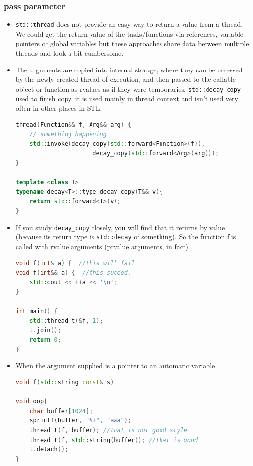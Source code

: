 \documentclass[a4paper,11pt,twoside]{book}
\begin{document}
\subsubsection{pass parameter}

\begin{itemize}
	\item \texttt{std::thread} does not provide an easy way to return a value from a thread. We could get the return value of the tasks/functions via references, variable pointers or global variables but these approaches share data between multiple threads and look a bit cumbersome.
	
	\item The arguments are copied into internal storage, where they can be accessed by the newly created thread of execution, and then passed to the callable object or function as rvalues as if they were temporaries. \texttt{std::decay\_copy} used to finish copy. it is used mainly in thread context and isn't used very often in other places in STL.
	
\begin{lstlisting}[frame=single, language=c++]
thread(Function&& f, Arg&& arg) {
	// something happening
	std::invoke(decay_copy(std::forward<Function>(f)),
	                  decay_copy(std::forward<Arg>(arg)));
}
	
template <class T> 
typename decay<T>::type decay_copy(T&& v){
	return std::forward<T>(v); 
}
\end{lstlisting}

	\item  If you study \texttt{decay\_copy} closely, you will find that it returns by value (because its return type is \texttt{std::decay} of something). So the function f is called with rvalue arguments (prvalue arguments, in fact).

\begin{lstlisting}[frame=single, language=c++]
void f(int& a) {  //this will fail
void f(int&& a) {  //this suceed.
	std::cout << ++a << '\n';
}

int main() {
	std::thread t(&f, 1);
	t.join();
	return 0;
}
\end{lstlisting}

		\item When the argument supplied is a pointer to an automatic variable.
\begin{lstlisting}[frame=single, language=c++]
void f(std::string const& s)
	
void oop{
	char buffer[1024];
	sprintf(buffer, "%i", "aaa");
	thread t(f, buffer); //that is not good style
	thread t(f, std::string(buffer)); //that is good
    t.detach();
}
\end{lstlisting}	


\end{itemize}
\end{document}
